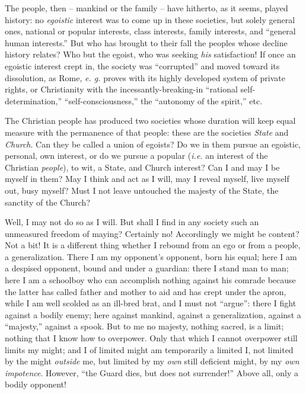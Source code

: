 \documentclass[12pt,a4paper]{book}
\begin{document}
The people, then -- mankind or the family -- have hitherto, as it seems, 
played history: no \textit{egoistic} interest was to come up in these 
societies, but solely general ones, national or popular interests, class 
interests, family interests, and ``general human interests.'' But who has 
brought to their fall the peoples whose decline history relates? Who but the 
egoist, who was seeking \textit{his} satisfaction! If once an egoistic 
interest crept in, the society was ``corrupted'' and moved toward its 
dissolution, as Rome, \textit{e. g.} proves with its highly developed system 
of private rights, or Christianity with the incessantly-breaking-in 
``rational self-determination,'' ``self-consciousness,'' the ``autonomy 
of the spirit,'' etc.

The Christian people has produced two societies whose duration will keep equal 
measure with the permanence of that people: these are the societies 
\textit{State} and \textit{Church}. Can they be called a union of egoists? Do 
we in them pursue an egoistic, personal, own interest, or do we pursue a 
popular (\textit{i.e.} an interest of the Christian \textit{people}), to wit, 
a State, and Church interest? Can I and may I be myself in them? May I think 
and act as I will, may I reveal myself, live myself out, busy myself? Must I 
not leave untouched the majesty of the State, the sanctity of the Church?

Well, I may not do so as I will. But shall I find in any society such an 
unmeasured freedom of maying? Certainly no! Accordingly we might be content? 
Not a bit! It is a different thing whether I rebound from an ego or from a 
people, a generalization. There I am my opponent's opponent, born his equal; 
here I am a despised opponent, bound and under a guardian: there I stand man 
to man; here I am a schoolboy who can accomplish nothing against his comrade 
because the latter has called father and mother to aid and has crept under the 
apron, while I am well scolded as an ill-bred brat, and I must not 
``argue'': there I fight against a bodily enemy; here against mankind, 
against a generalization, against a ``majesty,'' against a spook. But to me 
no majesty, nothing sacred, is a limit; nothing that I know how to overpower. 
Only that which I cannot overpower still limits my might; and I of limited 
might am temporarily a limited I, not limited by the might \textit{outside} 
me, but limited by my \textit{own} still deficient might, by my \textit{own 
impotence}. However, ``the Guard dies, but does not surrender!'' Above all, 
only a bodily opponent!
\end{document}
